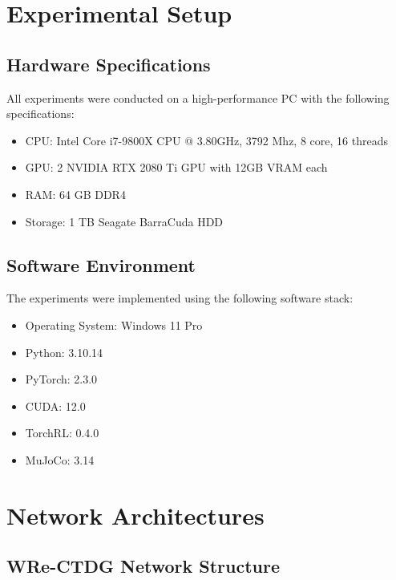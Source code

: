 \section{Experimental Setup}

\subsection{Hardware Specifications}

All experiments were conducted on a high-performance
PC with the following specifications:

\begin{itemize}
    \item CPU: Intel Core i7-9800X CPU @ 3.80GHz,
    3792 Mhz, 8 core, 16 threads
    \item GPU: 2 NVIDIA RTX 2080 Ti GPU with 12GB
    VRAM each
    \item RAM: 64 GB DDR4
    \item Storage: 1 TB Seagate BarraCuda HDD
\end{itemize}

\subsection{Software Environment}

The experiments were implemented using the following software stack:

\begin{itemize}
    \item Operating System: Windows 11 Pro
    \item Python: 3.10.14
    \item PyTorch: 2.3.0
    \item CUDA: 12.0
    \item TorchRL: 0.4.0
    \item MuJoCo: 3.14
\end{itemize}

\section{Network Architectures}

\subsection{WRe-CTDG Network Structure}

